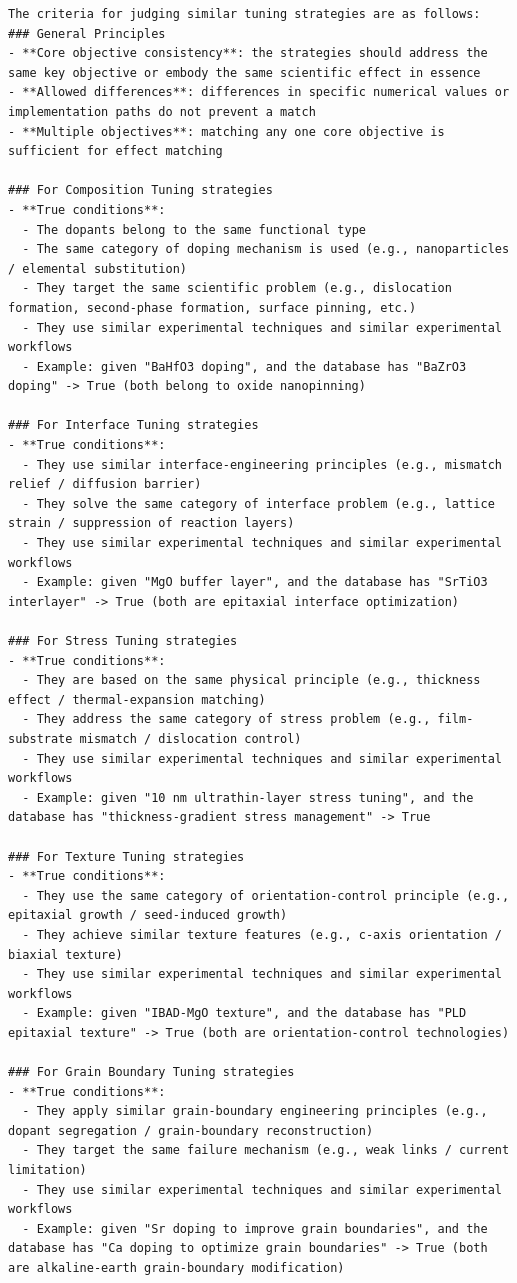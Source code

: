 \begin{lstlisting}[style=jsonstyle]
The criteria for judging similar tuning strategies are as follows:
### General Principles
- **Core objective consistency**: the strategies should address the same key objective or embody the same scientific effect in essence
- **Allowed differences**: differences in specific numerical values or implementation paths do not prevent a match
- **Multiple objectives**: matching any one core objective is sufficient for effect matching

### For Composition Tuning strategies
- **True conditions**:
  - The dopants belong to the same functional type
  - The same category of doping mechanism is used (e.g., nanoparticles / elemental substitution)
  - They target the same scientific problem (e.g., dislocation formation, second-phase formation, surface pinning, etc.)
  - They use similar experimental techniques and similar experimental workflows
  - Example: given "BaHfO3 doping", and the database has "BaZrO3 doping" -> True (both belong to oxide nanopinning)

### For Interface Tuning strategies
- **True conditions**:
  - They use similar interface-engineering principles (e.g., mismatch relief / diffusion barrier)
  - They solve the same category of interface problem (e.g., lattice strain / suppression of reaction layers)
  - They use similar experimental techniques and similar experimental workflows
  - Example: given "MgO buffer layer", and the database has "SrTiO3 interlayer" -> True (both are epitaxial interface optimization)

### For Stress Tuning strategies
- **True conditions**:
  - They are based on the same physical principle (e.g., thickness effect / thermal-expansion matching)
  - They address the same category of stress problem (e.g., film-substrate mismatch / dislocation control)
  - They use similar experimental techniques and similar experimental workflows
  - Example: given "10 nm ultrathin-layer stress tuning", and the database has "thickness-gradient stress management" -> True

### For Texture Tuning strategies
- **True conditions**:
  - They use the same category of orientation-control principle (e.g., epitaxial growth / seed-induced growth)
  - They achieve similar texture features (e.g., c-axis orientation / biaxial texture)
  - They use similar experimental techniques and similar experimental workflows
  - Example: given "IBAD-MgO texture", and the database has "PLD epitaxial texture" -> True (both are orientation-control technologies)

### For Grain Boundary Tuning strategies
- **True conditions**:
  - They apply similar grain-boundary engineering principles (e.g., dopant segregation / grain-boundary reconstruction)
  - They target the same failure mechanism (e.g., weak links / current limitation)
  - They use similar experimental techniques and similar experimental workflows
  - Example: given "Sr doping to improve grain boundaries", and the database has "Ca doping to optimize grain boundaries" -> True (both are alkaline-earth grain-boundary modification)


\end{lstlisting}
